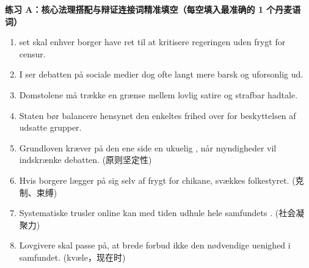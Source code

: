 
\textbf{练习 A：核心法理搭配与辩证连接词精准填空（每空填入最准确的 1 个丹麦语词）}
\begin{enumerate}
  \item \underline{\hspace{2.2cm}} set skal enhver borger have ret til at kritisere regeringen uden frygt for censur.
  \item I \underline{\hspace{2.2cm}} ser debatten på sociale medier dog ofte langt mere barsk og uforsonlig ud.
  \item Domstolene må trække en \underline{\hspace{2.2cm}} grænse mellem lovlig satire og strafbar hadtale.
  \item Staten bør balancere hensynet \underline{\hspace{2.2cm}} den enkeltes frihed over for beskyttelsen af udsatte grupper.
  \item Grundloven kræver på den ene side en ukuelig \underline{\hspace{2.2cm}}, når myndigheder vil indskrænke debatten. (原则坚定性)
  \item Hvis borgere lægger \underline{\hspace{2.2cm}} på sig selv af frygt for chikane, svækkes folkestyret. (克制、束缚)
  \item Systematiske trusler online kan med tiden udhule hele samfundets \underline{\hspace{2.2cm}}. (社会凝聚力)
  \item Lovgivere skal passe på, at brede forbud ikke \underline{\hspace{2.2cm}} den nødvendige uenighed i samfundet. (kvæle，现在时)
\end{enumerate}

